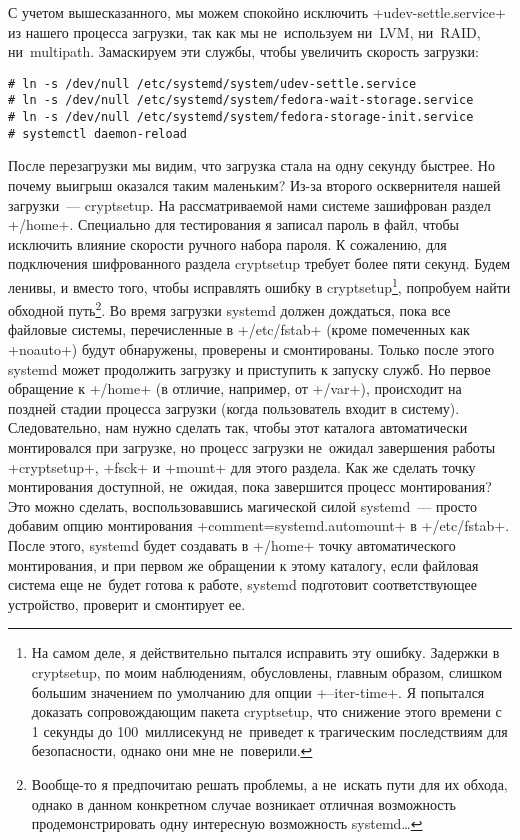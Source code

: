 \documentclass[10pt,oneside,a4paper]{article}
\begin{document}
С учетом вышесказанного, мы можем спокойно исключить +udev-settle.service+ из
нашего процесса загрузки, так как мы не~используем ни~LVM, ни~RAID,
ни~multipath. Замаскируем эти службы, чтобы увеличить скорость загрузки:
\begin{Verbatim}
# ln -s /dev/null /etc/systemd/system/udev-settle.service
# ln -s /dev/null /etc/systemd/system/fedora-wait-storage.service
# ln -s /dev/null /etc/systemd/system/fedora-storage-init.service
# systemctl daemon-reload
\end{Verbatim}

После перезагрузки мы видим, что загрузка стала на одну секунду быстрее. Но
почему выигрыш оказался таким маленьким? Из-за второго осквернителя нашей
загрузки~--- cryptsetup. На рассматриваемой нами системе зашифрован раздел
+/home+. Специально для тестирования я записал пароль в файл, чтобы исключить
влияние скорости ручного набора пароля. К сожалению, для подключения
шифрованного раздела cryptsetup требует более пяти секунд. Будем ленивы, и
вместо того, чтобы исправлять ошибку в cryptsetup\footnote{На самом деле, я
действительно пытался исправить эту ошибку. Задержки в cryptsetup, по
моим наблюдениям, обусловлены, главным образом, слишком большим значением по
умолчанию для опции +--iter-time+. Я попытался доказать сопровождающим пакета
cryptsetup, что снижение этого времени с 1 секунды до 100~миллисекунд
не~приведет к трагическим последствиям для безопасности, однако они мне
не~поверили.}, попробуем найти обходной путь\footnote{Вообще-то я предпочитаю
решать проблемы, а не~искать пути для их обхода, однако в данном конкретном
случае возникает отличная возможность продемонстрировать одну интересную
возможность systemd\ldots{}}. Во время загрузки systemd должен дождаться, пока
все файловые системы, перечисленные в +/etc/fstab+ (кроме помеченных как
+noauto+) будут обнаружены, проверены и смонтированы. Только после этого systemd
может продолжить загрузку и приступить к запуску служб. Но первое обращение
к +/home+ (в отличие, например, от +/var+), происходит на поздней стадии
процесса загрузки (когда пользователь входит в систему). Следовательно, нам
нужно сделать так, чтобы этот каталога автоматически монтировался при загрузке,
но процесс загрузки не~ожидал завершения работы +cryptsetup+, +fsck+ и +mount+
для этого раздела. Как же сделать точку монтирования доступной, не~ожидая, пока
завершится процесс монтирования? Это можно сделать, воспользовавшись магической
силой systemd~--- просто добавим опцию монтирования +comment=systemd.automount+
в +/etc/fstab+. После этого, systemd будет создавать в +/home+ точку
автоматического монтирования, и при первом же обращении к этому каталогу,
если файловая система еще не~будет готова к работе,
systemd подготовит соответствующее устройство, проверит и смонтирует ее.
\end{document}
